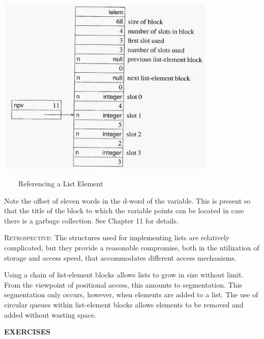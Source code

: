  \includegraphics[width=4.1681in,height=3.3799in]{ib-img/ib-img033.jpg} 


\ \ \ \ Referencing a List Element


Note the offset of eleven words in the d-word of the variable. This is
present so that the title of the block to which the variable points
can be located in case there is a garbage collection. See Chapter 11
for details.

\textsc{Retrospective}: The structures used for implementing lists are
relatively complicated, but they provide a reasonable compromise, both
in the utilization of storage and access speed, that accommodates
different access mechanisms.

Using a chain of list-element blocks allows lists to grow in size
without limit. From the viewpoint of positional access, this amounts
to segmentation. This segmentation only occurs, however, when elements
are added to a list. The use of circular queues within list-element
blocks allows elements to be removed and added without wasting space.

{\sffamily\bfseries
EXERCISES}

